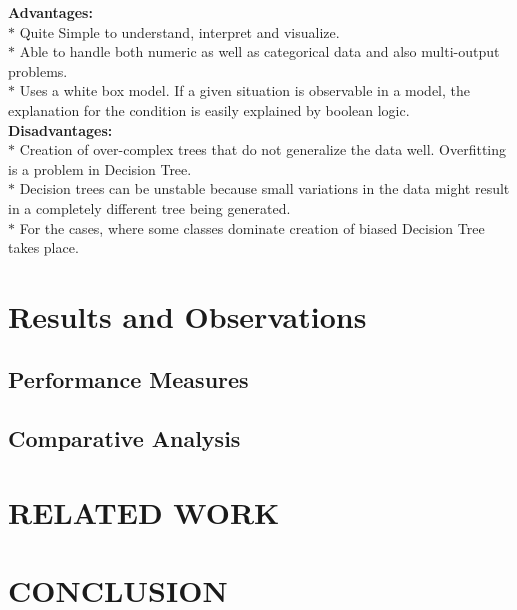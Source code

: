 \documentclass[a4paper, 10pt, conference]{IEEEtran}
\begin{document}
\textbf{Advantages:}
\\$\ast$ Quite Simple to understand, interpret and visualize.
\\$\ast$ Able to handle both numeric as well as categorical data and also multi-output problems.
\\$\ast$ Uses a white box model. If a given situation is observable in a model, the explanation for the condition is easily explained by boolean logic.\\

\textbf{Disadvantages:}
\\$\ast$ Creation of over-complex trees that do not generalize the data well. Overfitting is a problem in Decision Tree. 
\\$\ast$ Decision trees can be unstable because small variations in the data might result in a completely different tree being generated.
\\$\ast$ For the cases, where some classes dominate creation of biased Decision Tree takes place.


\section{Results and Observations}

\subsection{Performance Measures}
\subsection{Comparative Analysis}


\section{RELATED WORK}


\section{CONCLUSION}

\end{document}
